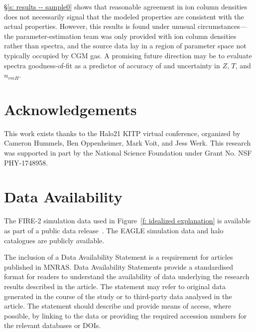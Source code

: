 \documentclass[fleqn,usenatbib]{mnras}
\begin{document}
\S\ref{s: results -- sample0} shows that reasonable agreement in ion column densities does not necessarily signal that the modeled properties are consistent with the actual properties.
However, this results is found under unusual circumstances---the parameter-estimation team was only provided with ion column densities rather than spectra, and the source data lay in a region of parameter space not typically occupied by CGM gas.
A promising future direction may be to evaluate spectra goodness-of-fit as a predictor of accuracy of and uncertainty in $Z$, $T$, and $n_{rm H}$.

\section*{Acknowledgements}

This work exists thanks to the Halo21 KITP virtual conference, organized by Cameron Hummels, Ben Oppenheimer, Mark Voit, and Jess Werk.
This research was supported in part by the National Science Foundation under Grant No. NSF PHY-1748958.

\section*{Data Availability}

The FIRE-2 simulation data used in Figure~\ref{f: idealized explanation} is available as part of a public data release~\citep{wetzel2022Public}.
The EAGLE simulation data \citep{EagleTeam2017} and halo catalogues \citep{McAlpine2016} are publicly available. 

The inclusion of a Data Availability Statement is a requirement for articles published in MNRAS. Data Availability Statements provide a standardised format for readers to understand the availability of data underlying the research results described in the article. The statement may refer to original data generated in the course of the study or to third-party data analysed in the article. The statement should describe and provide means of access, where possible, by linking to the data or providing the required accession numbers for the relevant databases or DOIs.




\end{document}
